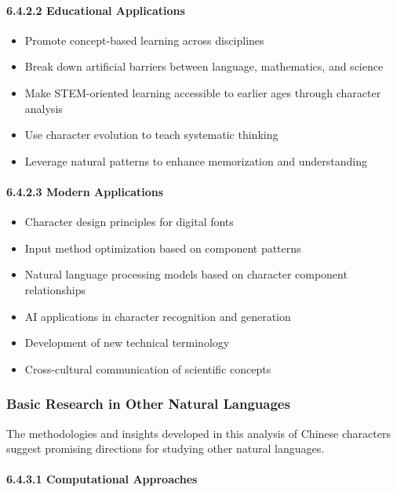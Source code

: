 \documentclass[11pt,letterpaper]{article}
\begin{document}
\paragraph{6.4.2.2 Educational
Applications}\label{educational-applications}

\begin{itemize}
\tightlist
\item
  Promote concept-based learning across disciplines
\item
  Break down artificial barriers between language, mathematics, and
  science
\item
  Make STEM-oriented learning accessible to earlier ages through
  character analysis
\item
  Use character evolution to teach systematic thinking
\item
  Leverage natural patterns to enhance memorization and understanding
\end{itemize}

\paragraph{6.4.2.3 Modern Applications}\label{modern-applications}

\begin{itemize}
\tightlist
\item
  Character design principles for digital fonts
\item
  Input method optimization based on component patterns
\item
  Natural language processing models based on character component
  relationships
\item
  AI applications in character recognition and generation
\item
  Development of new technical terminology
\item
  Cross-cultural communication of scientific concepts
\end{itemize}

\subsubsection{Basic Research in Other Natural Languages}\label{basic-research-in-other-natural-languages}

The methodologies and insights developed in this analysis of Chinese
characters suggest promising directions for studying other natural
languages.

\paragraph{6.4.3.1 Computational Approaches}\label{computational-approaches}
\end{document}
